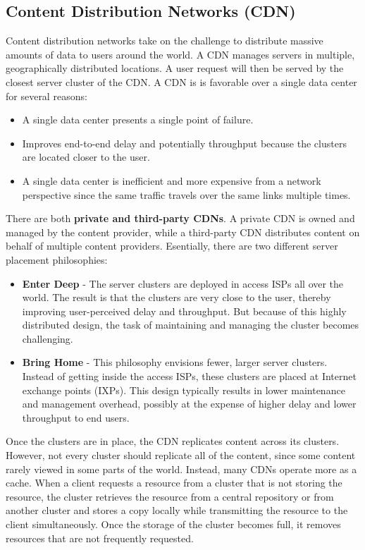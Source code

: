\subsection{Content Distribution Networks (CDN)}
Content distribution networks take on the challenge to distribute massive amounts of data to users around the world. A CDN manages servers in multiple, geographically distributed locations. A user request will then be served by the closest server cluster of the CDN. A CDN is is favorable over a single data center for several reasons:
\begin{itemize}
\item A single data center presents a single point of failure.
\item Improves end-to-end delay and potentially throughput because the clusters are located closer to the user.
\item A single data center is inefficient and more expensive from a network perspective since the same traffic travels over the same links multiple times.
\end{itemize}
There are both \textbf{private and third-party CDNs}. A private CDN is owned and managed by the content provider, while a third-party CDN distributes content on behalf of multiple content providers. Esentially, there are two different server placement philosophies:
\begin{itemize}
\item \textbf{Enter Deep} - The server clusters are deployed in access ISPs all over the world. The result is that the clusters are very close to the user, thereby improving user-perceived delay and throughput. But because of this highly distributed design, the task of maintaining and managing the cluster becomes challenging.
\item \textbf{Bring Home} - This philosophy envisions fewer, larger server clusters. Instead of getting inside the access ISPs, these clusters are placed at Internet exchange points (IXPs). This design typically results in lower maintenance and management overhead, possibly at the expense of higher delay and lower throughput to end users.
\end{itemize}
Once the clusters are in place, the CDN replicates content across its clusters. However, not every cluster should replicate all of the content, since some content rarely viewed in some parts of the world. Instead, many CDNs operate more as a cache. When a client requests a resource from a cluster that is not storing the resource, the cluster retrieves the resource from a central repository or from another cluster and stores a copy locally while transmitting the resource to the client simultaneously. Once the storage of the cluster becomes full, it removes resources that are not frequently requested. \vspace{.3cm}

